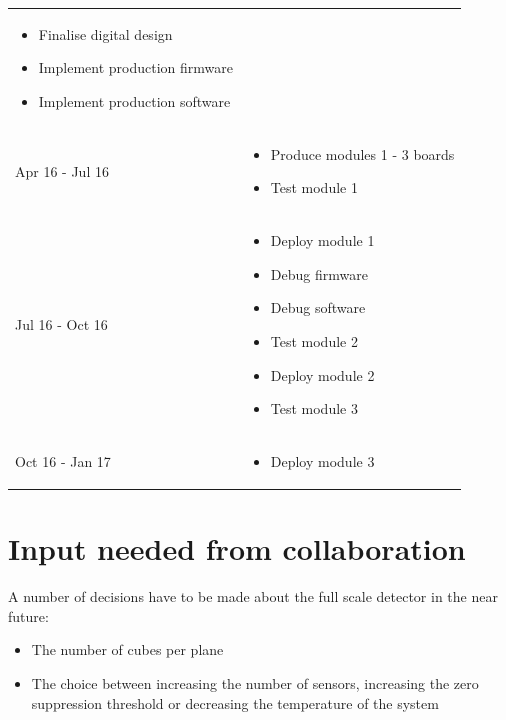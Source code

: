 \documentclass[a4paper]{article}
\begin{document}
\begin{table}[htp]
\begin{center}
\begin{tabular}{p{}p{}}
\begin{itemize}
                \item Finalise digital design
                \item Implement production firmware
                \item Implement production software
            \end{itemize}
            \\
            Apr 16 - Jul 16 & 
            \begin{itemize}
                \item Produce modules 1 - 3 boards
                \item Test module 1
            \end{itemize}
            \\
            Jul 16 - Oct 16 & 
            \begin{itemize}
                \item Deploy module 1
                \item Debug firmware
                \item Debug software
                \item Test module 2
                \item Deploy module 2
                \item Test module 3
            \end{itemize}
            \\
            Oct 16 - Jan 17 & 
            \begin{itemize}
                \item Deploy module 3
            \end{itemize}
            \\
            \hline
            \hline
        \end{tabular}
    \end{center}
\end{table}


\section{Input needed from collaboration}

A number of decisions have to be made about the full scale detector in the near future:
\begin{itemize}
    \item The number of cubes per plane
    \item The choice between increasing the number of sensors, increasing the zero suppression threshold or decreasing the temperature of the system
\end{itemize}
\end{document}
